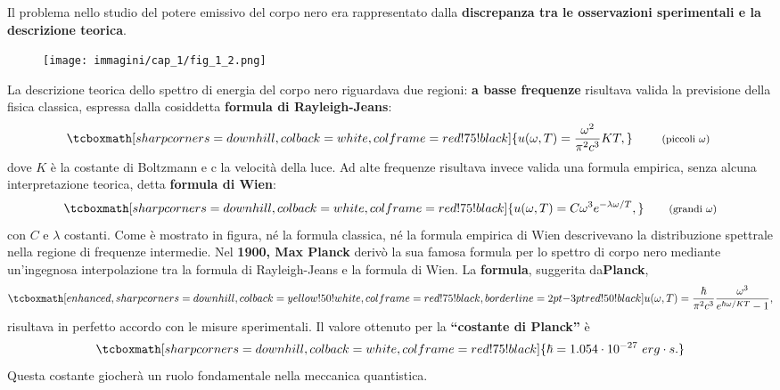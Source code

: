 Il problema nello studio del potere emissivo del corpo nero era rappresentato dalla \textbf{discrepanza tra le osservazioni sperimentali e la descrizione teorica}.
	\begin{figure}[!htbp]
		\begin{center}
			\texttt{[image: immagini/cap\_1/fig\_1\_2.png]}
		\end{center}
	\end{figure}
	
La descrizione teorica dello spettro di energia del corpo nero riguardava due regioni: \textbf{a basse frequenze} risultava valida la previsione della fisica classica, espressa dalla cosiddetta \textbf{formula di Rayleigh-Jeans}:
	\begin{equation}
		\tcboxmath[sharp corners=downhill ,colback=white,colframe=red!75!black]{
			u(\omega , T)= \frac{\omega ^2}{\pi ^2 c^3}KT,
		}
			\qquad \textrm{ \footnotesize{(piccoli $\omega$)} }
	\end{equation}
dove $K$ è la costante di Boltzmann e c la velocità della luce. Ad alte frequenze risultava invece valida una formula empirica, senza alcuna interpretazione teorica, detta \textbf{formula di Wien}:
	\begin{equation}
		\tcboxmath[sharp corners=downhill ,colback=white,colframe=red!75!black]{
			u(\omega ,T)= C \omega ^3 e^{-\lambda \omega /T},
		}
			\qquad \textrm{\footnotesize{(grandi $\omega$)}}
	\end{equation}
con $C$ e $\lambda$ costanti. Come è mostrato in figura, né la formula classica, né  la formula empirica di Wien descrivevano la distribuzione spettrale nella regione di frequenze intermedie.
Nel \textbf{1900, Max Planck} derivò la sua famosa formula per lo spettro di corpo nero mediante un'ingegnosa interpolazione tra la formula di Rayleigh-Jeans e la formula di Wien. La \textbf{formula}, suggerita da\textbf{Planck},
	\begin{equation}
	\tcboxmath[enhanced,sharp corners=downhill ,colback=yellow!50!white,colframe=red!75!black, borderline={2pt}{-3pt}{red!50!black}]{
		u(\omega, T) = \frac{\hbar}{\pi ^2 c^3}\frac{\omega ^3}{e^{\hbar \omega / KT}-1},
	}
\end{equation}
risultava in perfetto accordo con le misure sperimentali. Il valore ottenuto per la \textbf{``costante di Planck''} è
\[ \tcboxmath[sharp corners=downhill ,colback=white,colframe=red!75!black]{\hbar = 1.054 \cdot 10^{-27} \ erg\cdot s.}\]
Questa costante giocherà un ruolo fondamentale nella meccanica quantistica.\\

